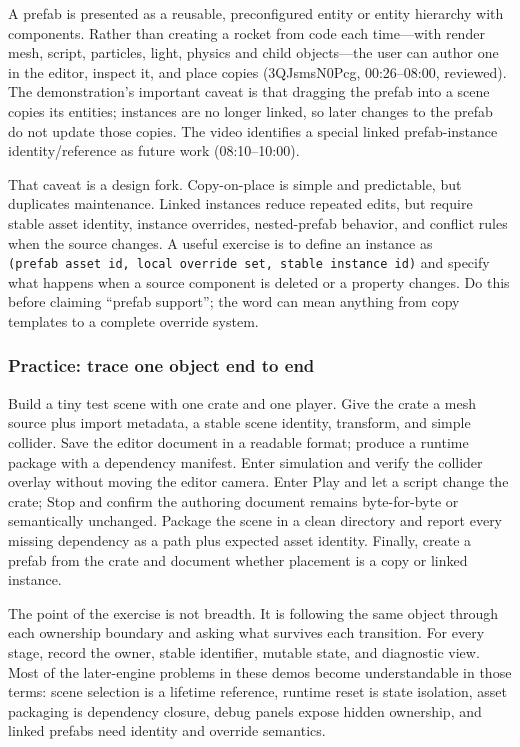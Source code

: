 A prefab is presented as a reusable, preconfigured entity or entity hierarchy with components. Rather than creating a rocket from code each time---with render mesh, script, particles, light, physics and child objects---the user can author one in the editor, inspect it, and place copies (3QJsmsN0Pcg, 00:26--08:00, reviewed). The demonstration's important caveat is that dragging the prefab into a scene copies its entities; instances are no longer linked, so later changes to the prefab do not update those copies. The video identifies a special linked prefab-instance identity/reference as future work (08:10--10:00).

That caveat is a design fork. Copy-on-place is simple and predictable, but duplicates maintenance. Linked instances reduce repeated edits, but require stable asset identity, instance overrides, nested-prefab behavior, and conflict rules when the source changes. A useful exercise is to define an instance as \texttt{(prefab\ asset\ id,\ local\ override\ set,\ stable\ instance\ id)} and specify what happens when a source component is deleted or a property changes. Do this before claiming ``prefab support''; the word can mean anything from copy templates to a complete override system.

\subsubsection{Practice: trace one object end to end}\label{practice-trace-one-object-end-to-end}

Build a tiny test scene with one crate and one player. Give the crate a mesh source plus import metadata, a stable scene identity, transform, and simple collider. Save the editor document in a readable format; produce a runtime package with a dependency manifest. Enter simulation and verify the collider overlay without moving the editor camera. Enter Play and let a script change the crate; Stop and confirm the authoring document remains byte-for-byte or semantically unchanged. Package the scene in a clean directory and report every missing dependency as a path plus expected asset identity. Finally, create a prefab from the crate and document whether placement is a copy or linked instance.

The point of the exercise is not breadth. It is following the same object through each ownership boundary and asking what survives each transition. For every stage, record the owner, stable identifier, mutable state, and diagnostic view. Most of the later-engine problems in these demos become understandable in those terms: scene selection is a lifetime reference, runtime reset is state isolation, asset packaging is dependency closure, debug panels expose hidden ownership, and linked prefabs need identity and override semantics.

